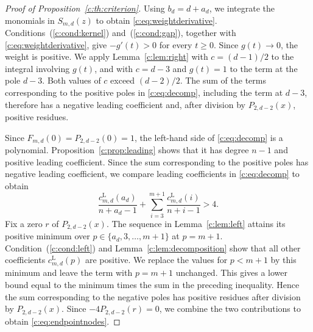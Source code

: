 \documentclass[11pt]{article}
\numberwithin{equation}{section}
\theoremstyle{remark}\newtheorem{remark}[theorem]{Remark}
\begin{document}
\begin{proof}[Proof of Proposition~\ref{c:th:criterion}]
Using $b_d=d+a_d$, we integrate the monomials in $S_{m,d}(z)$ to obtain
\eqref{c:eq:weightderivative}.
Conditions~(\ref{c:cond:kernel}) and~(\ref{c:cond:gap}), together with
\eqref{c:eq:weightderivative}, give $-g'(t)>0$ for every $t\ge0$.
Since $g(t)\to0$, the weight is positive.
We apply Lemma~\ref{c:lem:right} with
$c=(d-1)/2$ to the integral involving $g(t)$, and with $c=d-3$ and $g(t)=1$ to
the term at the pole $d-3$. Both values of $c$ exceed $(d-2)/2$.
The sum of the terms corresponding to the positive poles in \eqref{c:eq:decomp},
including the term at $d-3$, therefore has a negative leading
coefficient and, after division by $P_{2,d-2}(x)$, positive residues.

Since $F_{m,d}(0)=P_{2,d-2}(0)=1$, the left-hand side of
\eqref{c:eq:decomp} is a polynomial. Proposition~\ref{c:prop:leading}
shows that it has degree $n-1$ and positive leading coefficient.
Since the sum corresponding to the positive poles has negative leading coefficient,
we compare leading coefficients in \eqref{c:eq:decomp} to obtain
\[
 \frac{c_{m,d}^{\mathrm L}(a_d)}{n+a_d-1}
 +\sum_{i=3}^{m+1}\frac{c_{m,d}^{\mathrm L}(i)}{n+i-1}>4.
\]
Fix a zero $r$ of $P_{2,d-2}(x)$. The sequence in Lemma~\ref{c:lem:left}
attains its positive minimum over $p\in\{a_d,3,\ldots,m+1\}$ at $p=m+1$.
Condition~(\ref{c:cond:left}) and Lemma~\ref{c:lem:decomposition} show that
all other coefficients $c_{m,d}^{\mathrm L}(p)$ are positive.
We replace the values for $p<m+1$ by this minimum and leave the term
with $p=m+1$ unchanged. This gives a lower bound equal to the minimum
times the sum in the preceding inequality. Hence the sum corresponding
to the negative poles has positive residues after division by $P_{2,d-2}(x)$.
Since $-4P_{2,d-2}(r)=0$, we combine the two contributions to obtain
\eqref{c:eq:endpointnodes}.
\end{proof}
\end{document}
